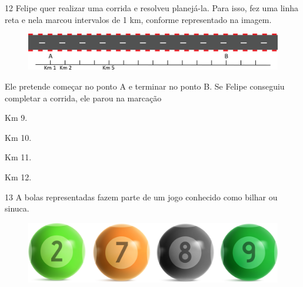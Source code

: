 

\num{12} Felipe quer realizar uma corrida e resolveu planejá-la. Para isso, fez
uma linha reta e nela marcou intervalos de 1 km, conforme representado na imagem.

\begin{figure}[htpb!]
\centering
\includegraphics[width=\textwidth]{./media/image6.png}
\end{figure}


Ele pretende começar no ponto A e terminar no ponto B. Se Felipe
conseguiu completar a corrida, ele parou na marcação

\begin{minipage}{.5\textwidth}
\begin{escolha}
\item Km 9.

\item Km 10.

\item Km 11.

\item Km 12.
\end{escolha}
\end{minipage}

\pagebreak
\num{13} A bolas representadas fazem parte de um jogo conhecido como
bilhar ou sinuca.

\begin{figure}[htpb!]
\centering
\includegraphics[width=\textwidth]{./media/image7.png}
\end{figure}

